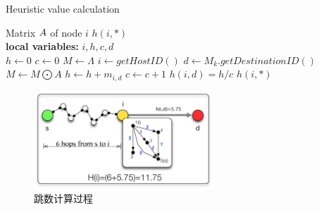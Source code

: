 \begin{algorithm}[tbp] %
\caption{Heuristic value calculation} %
\label{alg:chap5_heuristic} %
\begin{algorithmic}[1] %
\REQUIRE  %
Matrix $\boldmath{A}$ of node $i$
\ENSURE  %
$h(i,*)$\\
\textbf{local variables:} $i,h,c,d$ \\
    \STATE $h\leftarrow 0$
    \STATE $c\leftarrow 0$
    \STATE $M\leftarrow \Lambda$
    \STATE $i\leftarrow getHostID()$
    \STATE $d\leftarrow M_k.getDestinationID()$
    \REPEAT
        \STATE $M\leftarrow M\bigodot A$
        \STATE $h\leftarrow h+m_{i,d}$
        \STATE $c\leftarrow c+1$
    \STATE $h(i,d)=h/c$
\ENDFOR
\RETURN $h(i,*)$ %
\end{algorithmic}
\end{algorithm}


\begin{figure}[bt]
  \centering
  \includegraphics[width=0.6\textwidth]{paper-HCH/heuristic}
  \caption{跳数计算过程}
  \label{fig:chap5_heuristic}
\end{figure}

